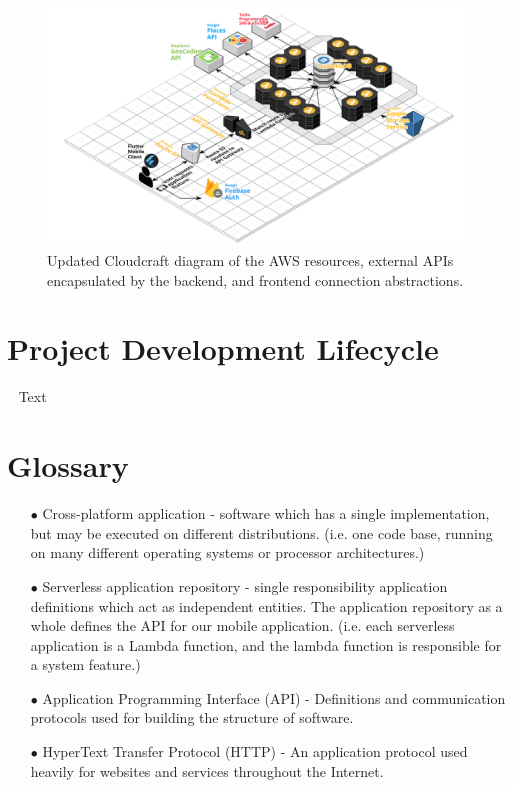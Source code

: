 \documentclass[10pt, a4paper]{article}
\begin{document}
\begin{figure}[H]
\begin{center}
\centerline{
	\includegraphics[scale=.2]{EmergenSeek-Backend.PNG}
}
\caption{Updated Cloudcraft diagram of the AWS resources, external APIs encapsulated by the backend, and frontend connection abstractions.}
\end{center}	
\end{figure}

\section{Project Development Lifecycle} 
\label{sec:pdl}
\par ~ Text 

\section{Glossary}
\begin{enumerate}
	\item[$\bullet$] Cross-platform application - software which has a single implementation, but may be executed on different distributions. (i.e. one code base, running on many different operating systems or processor architectures.)
	\item[$\bullet$] Serverless application repository - single responsibility application definitions which act as independent entities. The application repository as a whole defines the API for our mobile application. (i.e. each serverless application is a Lambda function, and the lambda function is responsible for a system feature.)
	\item[$\bullet$] Application Programming Interface (API) - Definitions and communication protocols used for building the structure of software.
	\item[$\bullet$] HyperText Transfer Protocol (HTTP) - An application protocol used heavily for websites and services throughout the Internet.
\end{enumerate}
\end{document}
